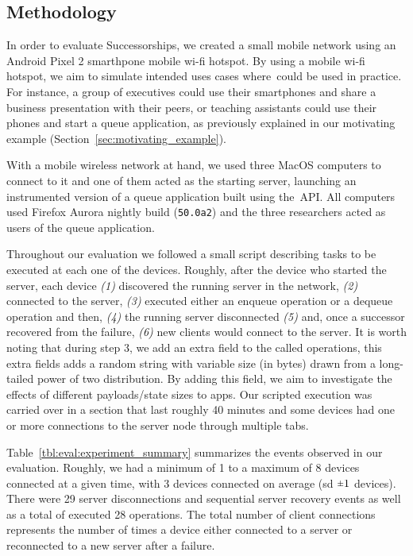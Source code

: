 \subsection{Methodology}
\label{sub:eval:evaluation_methodology}

In order to evaluate Successorships, we created a small mobile network using an Android Pixel 2 smarthpone mobile wi-fi hotspot.
By using a mobile wi-fi hotspot, we aim to simulate intended uses cases where~\APIName could be used in practice.
For instance, a group of executives could use their smartphones and share a business presentation with their peers, or teaching assistants could use their phones and start a queue application, as previously explained in our motivating example (Section~\ref{sec:motivating_example}).


With a mobile wireless network at hand, we used three MacOS computers to connect to it and one of them acted as the starting server, launching an instrumented version of a queue application built using the~\APIName API. 
All computers used Firefox Aurora nightly build ({\texttt{50.0a2}}) and the three researchers acted as users of the queue application.


Throughout our evaluation we followed a small script describing tasks to be executed at each one of the devices. 
Roughly, after the device who started the server, each device
{\it (1)} discovered the running server in the network,
{\it (2)} connected to the server,
{\it (3)} executed either an enqueue operation or a dequeue operation and then, 
{\it (4)} the running server disconnected
{\it (5)} and, once a successor recovered from the failure,
{\it (6)} new clients would connect to the server.
It is worth noting that during step 3, we add an extra field to the called operations, this extra fields adds a random string with variable size (in bytes) drawn from a long-tailed power of two distribution. 
By adding this field, we aim to investigate the effects of different payloads/state sizes to \APIName apps.
Our scripted execution was carried over in a section that last roughly 40 minutes and some devices had one or more connections to the server node through multiple tabs.


Table~\ref{tbl:eval:experiment_summary} summarizes the events observed in our evaluation.
Roughly, we had a minimum of 1 to a maximum of 8 devices connected at a given time, with 3 devices connected on average (sd $\rpm 1$ devices). 
There were 29 server disconnections and sequential server recovery events as well as a total of executed 28 operations. 
The total number of client connections represents the number of times a device either connected to a server or reconnected to a new server after a failure.

